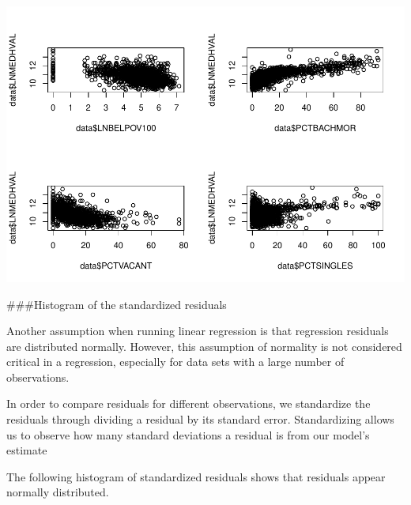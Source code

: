 \documentclass[
]{article}
\newenvironment{Shaded}{\begin{snugshade}}{\end{snugshade}}
\newcommand{\AttributeTok}[1]{\textcolor[rgb]{0.13,0.29,0.53}{#1}}
\newcommand{\CommentTok}[1]{\textcolor[rgb]{0.56,0.35,0.01}{\textit{#1}}}
\newcommand{\DecValTok}[1]{\textcolor[rgb]{0.00,0.00,0.81}{#1}}
\newcommand{\FunctionTok}[1]{\textcolor[rgb]{0.13,0.29,0.53}{\textbf{#1}}}
\newcommand{\NormalTok}[1]{#1}
\newcommand{\OtherTok}[1]{\textcolor[rgb]{0.56,0.35,0.01}{#1}}
\newcommand{\SpecialCharTok}[1]{\textcolor[rgb]{0.81,0.36,0.00}{\textbf{#1}}}
\begin{document}
\includegraphics{HW1-Regression_files/figure-latex/scatter-1.pdf}

\#\#\#Histogram of the standardized residuals

Another assumption when running linear regression is that regression
residuals are distributed normally. However, this assumption of
normality is not considered critical in a regression, especially for
data sets with a large number of observations.

In order to compare residuals for different observations, we standardize
the residuals through dividing a residual by its standard error.
Standardizing allows us to observe how many standard deviations a
residual is from our model's estimate

The following histogram of standardized residuals shows that residuals
appear normally distributed.

\begin{Shaded}
\end{Shaded}
\end{document}
